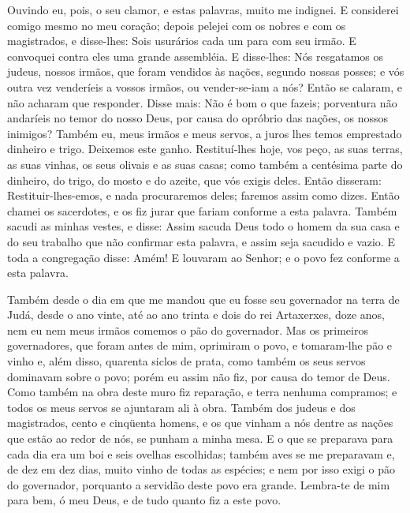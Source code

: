 Ouvindo eu, pois, o seu clamor, e estas palavras, muito me
indignei. E considerei comigo mesmo no meu coração; depois
pelejei com os nobres e com os magistrados, e disse-lhes: Sois
usurários cada um para com seu irmão. E convoquei contra eles uma
grande assembléia. E disse-lhes: Nós resgatamos os judeus,
nossos irmãos, que foram vendidos às nações, segundo nossas posses;
e vós outra vez venderíeis a vossos irmãos, ou vender-se-iam a nós?
Então se calaram, e não acharam que responder. Disse mais: Não é
bom o que fazeis; porventura não andaríeis no temor do nosso Deus,
por causa do opróbrio das nações, os nossos inimigos? Também
eu, meus irmãos e meus servos, a juros lhes temos emprestado
dinheiro e trigo. Deixemos este ganho. Restituí-lhes hoje,
vos peço, as suas terras, as suas vinhas, os seus olivais e as suas
casas; como também a centésima parte do dinheiro, do trigo, do mosto
e do azeite, que vós exigis deles. Então disseram:
Restituir-lhes-emos, e nada procuraremos deles; faremos assim como
dizes. Então chamei os sacerdotes, e os fiz jurar que fariam
conforme a esta palavra. Também sacudi as minhas vestes, e
disse: Assim sacuda Deus todo o homem da sua casa e do seu trabalho
que não confirmar esta palavra, e assim seja sacudido e vazio. E
toda a congregação disse: Amém! E louvaram ao Senhor; e o povo fez
conforme a esta palavra.

Também desde o dia em que me mandou que eu fosse seu governador
na terra de Judá, desde o ano vinte, até ao ano trinta e dois do rei
Artaxerxes, doze anos, nem eu nem meus irmãos comemos o pão do
governador. Mas os primeiros governadores, que foram antes de
mim, oprimiram o povo, e tomaram-lhe pão e vinho e, além disso,
quarenta siclos de prata, como também os seus servos dominavam sobre
o povo; porém eu assim não fiz, por causa do temor de Deus.
Como também na obra deste muro fiz reparação, e terra nenhuma
compramos; e todos os meus servos se ajuntaram ali à obra.
Também dos judeus e dos magistrados, cento e cinqüenta
homens, e os que vinham a nós dentre as nações que estão ao redor de
nós, se punham a minha mesa. E o que se preparava para cada
dia era um boi e seis ovelhas escolhidas; também aves se me
preparavam e, de dez em dez dias, muito vinho de todas as espécies;
e nem por isso exigi o pão do governador, porquanto a servidão deste
povo era grande. Lembra-te de mim para bem, ó meu Deus, e de
tudo quanto fiz a este povo.

\medskip

